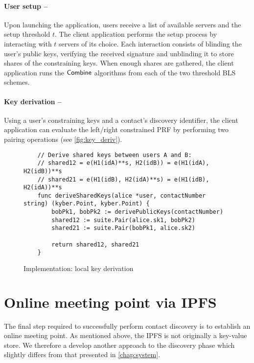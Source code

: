 	\paragraph{User setup --} Upon launching the application, users receive a list of available servers and the setup threshold $t$. The client application performs the setup process by interacting with $t$ servers of its choice. Each interaction consists of blinding the user's public keys, verifying the received signature and unblinding it to store shares of the constraining keys. When enough shares are gathered, the client application runs the $\mathsf{Combine}$ algorithms from each of the two threshold BLS schemes.



	\paragraph{Key derivation --} Using a user's constraining keys and a contact's discovery identifier, the client application can evaluate the left/right constrained PRF by performing two pairing operations (see \autoref{fig:key_deriv}).
	
	\begin{figure}[H]
	\begin{center}
		\begin{lstlisting}
	// Derive shared keys between users A and B:
	// shared12 = e(H1(idA)**s, H2(idB)) = e(H1(idA), H2(idB))**s
	// shared21 = e(H1(idB), H2(idA)**s) = e(H1(idB), H2(idA))**s
	func deriveSharedKeys(alice *user, contactNumber string) (kyber.Point, kyber.Point) {
		bobPk1, bobPk2 := derivePublicKeys(contactNumber)
		shared12 := suite.Pair(alice.sk1, bobPk2)
		shared21 := suite.Pair(bobPk1, alice.sk2)
	
		return shared12, shared21
	}
		\end{lstlisting}
	\caption{Implementation: local key derivation}
	\label{fig:key_deriv}
	\end{center}
\end{figure}



\section{Online meeting point via IPFS}

	\paragraph{} The final step required to successfully perform contact discovery is to establish an online meeting point. As mentioned above, the IPFS is not originally a key-value store. We therefore a develop another approach to the discovery phase which slightly differs from that presented in \autoref{chap:system}.
	
